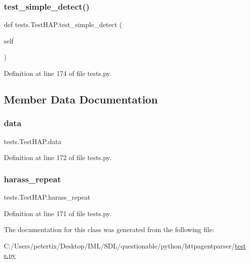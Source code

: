 \hypertarget{classtests_1_1_test_h_a_p_ad27d09e13b3cbf4e3cb45c9439d0c217}{}\label{classtests_1_1_test_h_a_p_ad27d09e13b3cbf4e3cb45c9439d0c217} 
\subsubsection{\texorpdfstring{test\+\_\+simple\+\_\+detect()}{test\_simple\_detect()}}
{\footnotesize\ttfamily def tests.\+Test\+H\+A\+P.\+test\+\_\+simple\+\_\+detect (\begin{DoxyParamCaption}\item[{}]{self }\end{DoxyParamCaption})}



Definition at line 174 of file tests.\+py.



\subsection{Member Data Documentation}
\hypertarget{classtests_1_1_test_h_a_p_a87728bcf107df9fe5331b03da1b7c2f2}{}\label{classtests_1_1_test_h_a_p_a87728bcf107df9fe5331b03da1b7c2f2} 
\subsubsection{\texorpdfstring{data}{data}}
{\footnotesize\ttfamily tests.\+Test\+H\+A\+P.\+data}



Definition at line 172 of file tests.\+py.

\hypertarget{classtests_1_1_test_h_a_p_aecf3ec2a5e12bc64920acf9a1ed7a38c}{}\label{classtests_1_1_test_h_a_p_aecf3ec2a5e12bc64920acf9a1ed7a38c} 
\subsubsection{\texorpdfstring{harass\+\_\+repeat}{harass\_repeat}}
{\footnotesize\ttfamily tests.\+Test\+H\+A\+P.\+harass\+\_\+repeat}



Definition at line 171 of file tests.\+py.



The documentation for this class was generated from the following file\+:\begin{DoxyCompactItemize}
\item 
C\+:/\+Users/petertix/\+Desktop/\+I\+M\+L/\+S\+D\+L/questionable/python/httpagentparser/\hyperlink{tests_8py}{tests.\+py}\end{DoxyCompactItemize}
